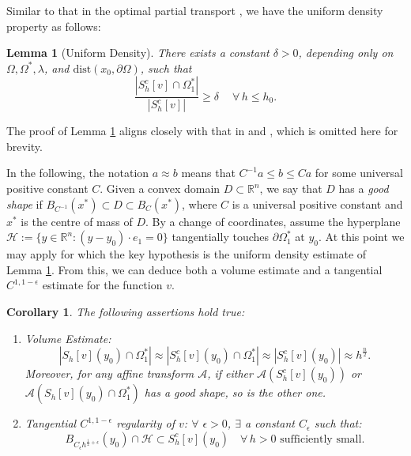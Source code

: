 \documentclass[11pt]{amsart}
\theoremstyle{plain}
\newtheorem{lemma}{Lemma}[section]
\newtheorem{corollary}{Corollary}[section]
\newcommand{\0}{\textbf{0}}
\numberwithin{equation}{section}
\numberwithin{equation}{section}
\numberwithin{figure}{section}
\begin{document}
Similar to that in the optimal partial transport \cite[Lemma 2.6]{CLW3}, we have the uniform density property as follows:
\begin{lemma}[Uniform Density]\label{ud1}
There exists a constant $\delta > 0$, depending only on $\Omega, \Omega^*, \lambda$, and $\text{dist}(x_0, \partial\Omega)$, such that
\[
\frac{|S_h^c[v] \cap \Omega^*_1|}{|S_h^c[v]|} \geq \delta \quad \ \forall\, h\leq h_0.
\]
\end{lemma}

The proof of Lemma \ref{ud1} aligns closely with that in \cite[Theorem 3.1]{C96} and \cite[Lemma 2.6]{CLW3}, which is omitted here for brevity. 


In the following, the notation $a \approx b$ means that $C^{-1}a \leq b \leq Ca$ for some universal positive constant $C.$  Given a convex domain $D \subset \mathbb{R}^n$, we say that $D$ has a \emph{good shape} if $B_{C^{-1}}(x^*) \subset D \subset B_{C}(x^*)$, where $C$ is a universal positive constant and $x^*$ is the centre of mass of $D$.
By a change of coordinates, assume the hyperplane \( \mathcal{H}:=\{y \in \mathbb{R}^n : (y-y_0)\cdot e_1 = 0\} \) tangentially touches \( \partial\Omega_1^* \) at \( y_0 \). 
At this point we may apply \cite[Corollary 2.7]{CLW3} for which the key hypothesis is the uniform density estimate of Lemma \ref{ud1}. From this, we can deduce both a volume estimate and a tangential \( C^{1,1-\epsilon} \) estimate for the function \( v \).




\begin{corollary}\label{co21}
The following assertions hold true:
\begin{enumerate}
\item[(i)] \emph{Volume Estimate:}
\begin{equation}\label{vol}
|S_h[v](y_0)\cap \Omega_1^*| \approx |S_h^c[v](y_0)\cap \Omega_1^*| \approx |S_h^c[v](y_0)| \approx h^{\frac{n}{2}}.
\end{equation}
Moreover, for any affine transform $\mathcal{A}$, 
if either $\mathcal{A}(S_h^c[v](y_0))$ or $\mathcal{A}(S_h[v](y_0) \cap \Omega_1^*)$ has a good shape, so is the other one.

\item[(ii)] \emph{Tangential $C^{1,1-\epsilon}$ regularity of $v$:} $\forall$ $\epsilon > 0$, $\exists$ a constant $C_\epsilon$ such that:
\begin{equation}\label{tanc2}
B_{C_\epsilon h^{\frac{1}{2}+\epsilon}}(y_0) \cap \mathcal{H} \subset S_h^c[v](y_0) \quad \forall\, h > 0\text{ sufficiently small}.
\end{equation}
\end{enumerate}
\end{corollary}
\end{document}
